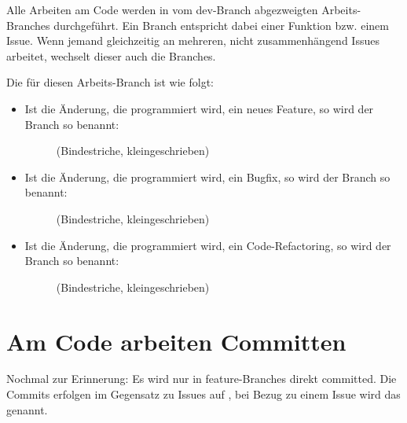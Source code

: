 \documentclass[letterpaper,10pt,ngerman]{sphinxmanual}
\begin{document}
Alle Arbeiten am Code werden in vom dev-Branch abgezweigten Arbeits-Branches durchgeführt. Ein Branch entspricht dabei einer Funktion bzw. einem Issue. Wenn jemand gleichzeitig an mehreren, nicht zusammenhängend Issues arbeitet, wechselt dieser auch die Branches.

Die  für diesen Arbeits-Branch ist wie folgt:
\begin{itemize}
\item {} \begin{description}
\item[{Ist die Änderung, die programmiert wird, ein neues Feature, so wird der Branch so benannt:}] \leavevmode
{} (Bindestriche, kleingeschrieben)

\end{description}

\item {} \begin{description}
\item[{Ist die Änderung, die programmiert wird, ein Bugfix, so wird der Branch so benannt:}] \leavevmode
{} (Bindestriche, kleingeschrieben)

\end{description}

\item {} \begin{description}
\item[{Ist die Änderung, die programmiert wird, ein Code-Refactoring, so wird der Branch so benannt:}] \leavevmode
{} (Bindestriche, kleingeschrieben)

\end{description}

\end{itemize}


\section{Am Code arbeiten \textendash{} Committen}
\label{\detokenize{dev/git:am-code-arbeiten-committen}}
Nochmal zur Erinnerung: Es wird nur in feature-Branches direkt committed.
Die Commits erfolgen im Gegensatz zu Issues auf , bei Bezug zu einem Issue wird das  genannt.
\end{document}
